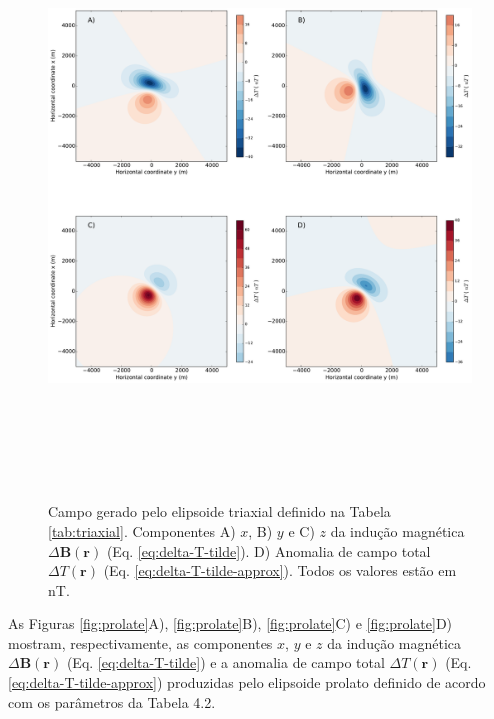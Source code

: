 \begin{figure}[hbt!]
	\centering \includegraphics[width=16cm,height=16cm]{figures/ellipsoid_triaxial}
	\caption[Campo gerado pelo elipsoide triaxial definido na Tabela \ref{tab:triaxial}. Componentes A) $x$, B) $y$ e C) $z$ da indução magnética $\Delta \mathbf{B}(\mathbf{r})$ (Eq. \ref{eq:delta-T-tilde}). D) Anomalia de campo total $\Delta T (\mathbf{r})$ (Eq. \ref{eq:delta-T-tilde-approx}). Todos os valores estão em nT.]{Campo gerado pelo elipsoide triaxial definido na Tabela \ref{tab:triaxial}. Componentes A) $x$, B) $y$ e C) $z$ da indução magnética $\Delta \mathbf{B}(\mathbf{r})$ (Eq. \ref{eq:delta-T-tilde}). D) Anomalia de campo total $\Delta T (\mathbf{r})$ (Eq. \ref{eq:delta-T-tilde-approx}). Todos os valores estão em nT.}
	\label{fig:triaxial}
\end{figure}

As Figuras \ref{fig:prolate}A), \ref{fig:prolate}B), \ref{fig:prolate}C) e \ref{fig:prolate}D) mostram, respectivamente, as componentes $x$, $y$ e $z$ da indução magnética $\Delta \mathbf{B}(\mathbf{r})$ (Eq. \ref{eq:delta-T-tilde}) e a
anomalia de campo total $\Delta T (\mathbf{r})$ (Eq. \ref{eq:delta-T-tilde-approx}) produzidas pelo elipsoide prolato definido de acordo com os parâmetros da Tabela 4.2.

